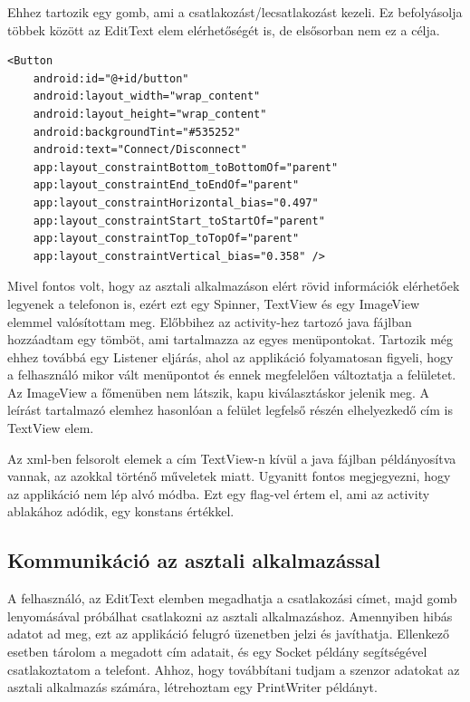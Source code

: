 \documentclass[
]{thesis-ekf}
\theoremstyle{definition}
\theoremstyle{remark}
\begin{document}
Ehhez tartozik egy gomb, ami a csatlakozást/lecsatlakozást kezeli. Ez befolyásolja többek között az EditText elem elérhetőségét is, de elsősorban nem ez a célja.

\begin{lstlisting}[caption={Button létrehozása xml-ben}]
<Button
	android:id="@+id/button"
	android:layout_width="wrap_content"
	android:layout_height="wrap_content"
	android:backgroundTint="#535252"
	android:text="Connect/Disconnect"
	app:layout_constraintBottom_toBottomOf="parent"
	app:layout_constraintEnd_toEndOf="parent"
	app:layout_constraintHorizontal_bias="0.497"
	app:layout_constraintStart_toStartOf="parent"
	app:layout_constraintTop_toTopOf="parent"
	app:layout_constraintVertical_bias="0.358" />
\end{lstlisting}

Mivel fontos volt, hogy az asztali alkalmazáson elért rövid információk elérhetőek legyenek a telefonon is, ezért ezt egy Spinner, TextView és egy ImageView elemmel valósítottam meg. Előbbihez az activity-hez tartozó java fájlban hozzáadtam egy tömböt, ami tartalmazza az egyes menüpontokat. Tartozik még ehhez továbbá egy Listener eljárás, ahol az applikáció folyamatosan figyeli, hogy a felhasználó mikor vált menüpontot és ennek megfelelően változtatja a felületet. Az ImageView a főmenüben nem látszik, kapu kiválasztáskor jelenik meg. A leírást tartalmazó elemhez hasonlóan a felület legfelső részén elhelyezkedő cím is TextView elem.


Az xml-ben felsorolt elemek a cím TextView-n kívül a java fájlban példányosítva vannak, az azokkal történő műveletek miatt. Ugyanitt fontos megjegyezni, hogy az applikáció nem lép alvó módba. Ezt egy flag-vel értem el, ami az activity ablakához adódik, egy konstans értékkel.

\subsection{Kommunikáció az asztali alkalmazással}
A felhasználó, az EditText elemben megadhatja a csatlakozási címet, majd gomb lenyomásával próbálhat csatlakozni az asztali alkalmazáshoz. Amennyiben hibás adatot ad meg, ezt az applikáció felugró üzenetben jelzi és javíthatja. Ellenkező esetben tárolom a megadott cím adatait, és egy Socket példány segítségével csatlakoztatom a telefont. Ahhoz, hogy továbbítani tudjam a szenzor adatokat az asztali alkalmazás számára, létrehoztam egy PrintWriter példányt.
\end{document}
